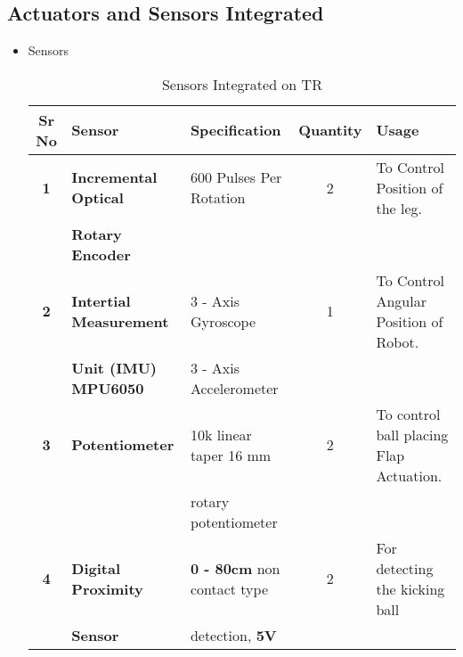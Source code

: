     \subsection{Actuators and Sensors Integrated}
        \begin{itemize}
            \item Sensors
            \begin{table}[h]
                \caption {Sensors Integrated on TR} \label{Sensors_TR}  \small
                \begin{tabular}{|c|l|l|c|l|}
                    \hline  \hline
                    \textbf{Sr No}  & \textbf{Sensor}                   & \textbf{Specification}                & \textbf{Quantity} & \textbf{Usage}                                      \\ \hline   \hline                    
                    \textbf{1}      & \textbf{Incremental Optical}      & 600 Pulses Per Rotation               &        2          & To Control Position of the leg.                     \\
                                    & \textbf{Rotary Encoder}           &                                       &                   &                                                     \\ \hline         
                    \textbf{2}      & \textbf{Intertial Measurement}    & 3 - Axis Gyroscope                    &        1          & To Control Angular Position of  Robot.              \\ 
                                    & \textbf{Unit (IMU) MPU6050}       & 3 - Axis Accelerometer                &                   &                                                     \\ \hline 
                    \textbf{3}      & \textbf{Potentiometer}            & 10k linear taper 16 mm                &        2          & To control ball placing Flap Actuation.             \\
                                    &                                   & rotary potentiometer                  &                   &                                                     \\ \hline
                    \textbf{4}      & \textbf{Digital Proximity}        & \textbf{0 - 80cm} non contact type    &        2          & For detecting the kicking ball                      \\
                                    & \textbf{Sensor}                   & detection, \textbf{ 5V}               &                   &                                                     \\ \hline                                    

\end{tabular}
\end{table}
\end{itemize}

